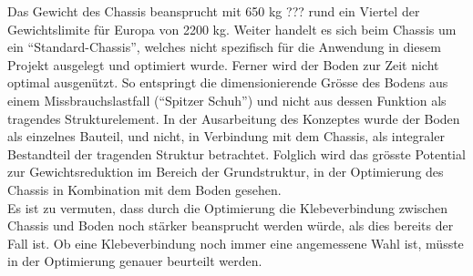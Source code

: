 Das Gewicht des Chassis beansprucht mit 650 kg ??? rund ein Viertel der Gewichtslimite für Europa von 2200 kg. Weiter handelt es sich beim Chassis um ein ``Standard-Chassis'', welches nicht spezifisch für die Anwendung in diesem Projekt ausgelegt und optimiert wurde. Ferner wird der Boden zur Zeit nicht optimal ausgenützt. So entspringt die dimensionierende Grösse des Bodens aus einem Missbrauchslastfall (``Spitzer Schuh'') und nicht aus dessen Funktion als tragendes Strukturelement. In der Ausarbeitung des Konzeptes wurde der Boden als einzelnes Bauteil, und nicht, in Verbindung mit dem Chassis, als integraler Bestandteil der tragenden Struktur betrachtet. Folglich wird das grösste Potential zur Gewichtsreduktion im Bereich der Grundstruktur, in der Optimierung des Chassis in Kombination mit dem Boden gesehen.\\
Es ist zu vermuten, dass durch die Optimierung die Klebeverbindung zwischen Chassis und Boden noch stärker beansprucht werden würde, als dies bereits der Fall ist. Ob eine Klebeverbindung noch immer eine angemessene Wahl ist, müsste in der Optimierung genauer beurteilt werden.
\newpage
